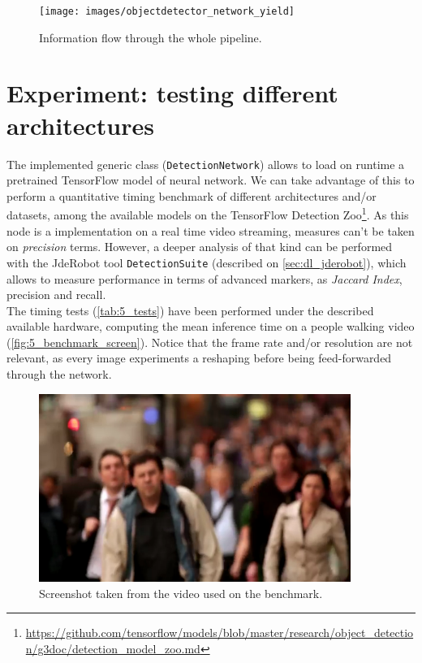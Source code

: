 		\begin{figure}[h]
			\centering
			\texttt{[image: images/objectdetector\_network\_yield]}
			\caption{Information flow through the whole pipeline.}
			\label{fig:5_whole_pipeline}
		\end{figure}


\section{Experiment: testing different architectures}
	The implemented generic class (\texttt{DetectionNetwork}) allows to load on runtime a pretrained TensorFlow model of neural network. We can take advantage of this to perform a quantitative timing benchmark of different architectures and/or datasets, among the available models on the TensorFlow Detection Zoo\footnote{\url{https://github.com/tensorflow/models/blob/master/research/object_detection/g3doc/detection_model_zoo.md}}. As this node is a implementation on a real time video streaming, measures can't be taken on \emph{precision} terms. However, a deeper analysis of that kind can be performed with the JdeRobot tool \texttt{DetectionSuite} (described on \autoref{sec:dl_jderobot}), which allows to measure performance in terms of advanced markers, as \emph{Jaccard Index}, precision and recall.\\
	
	The timing tests (\autoref{tab:5_tests}) have been performed under the described available hardware, computing the mean inference time on a people walking video (\autoref{fig:5_benchmark_screen}). Notice that the frame rate and/or resolution are not relevant, as every image experiments a reshaping before being feed-forwarded through the network.
	
	\begin{figure}[h]
		\centering
		\includegraphics[width=4in]{images/net_benchmarking_screenshot}
		\caption{Screenshot taken from the video used on the benchmark.}
		\label{fig:5_benchmark_screen}
	\end{figure}
	
